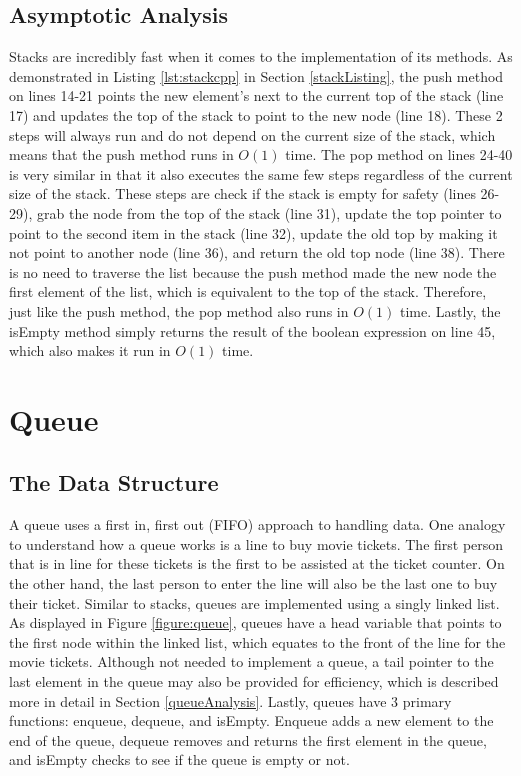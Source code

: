 \documentclass[letterpaper, 10pt,DIV=13]{scrartcl}
\numberwithin{equation}{section} %
\numberwithin{figure}{section} %
\numberwithin{table}{section} %
\begin{document}
\subsection{Asymptotic Analysis}\label{stackAnalysis}
Stacks are incredibly fast when it comes to the implementation of its methods. As demonstrated in Listing \ref{lst:stackcpp} in Section \ref{stackListing}, the push method on lines 14-21 points the new element's next to the current top of the stack (line 17) and updates the top of the stack to point to the new node (line 18). These 2 steps will always run and do not depend on the current size of the stack, which means that the push method runs in $O(1)$ time. The pop method on lines 24-40 is very similar in that it also executes the same few steps regardless of the current size of the stack. These steps are check if the stack is empty for safety (lines 26-29), grab the node from the top of the stack (line 31), update the top pointer to point to the second item in the stack (line 32), update the old top by making it not point to another node (line 36), and return the old top node (line 38). There is no need to traverse the list because the push method made the new node the first element of the list, which is equivalent to the top of the stack. Therefore, just like the push method, the pop method also runs in $O(1)$ time. Lastly, the isEmpty method simply returns the result of the boolean expression on line 45, which also makes it run in $O(1)$ time.

\section{Queue}
\subsection{The Data Structure}\label{queueDataStructure}
A queue uses a first in, first out (FIFO) approach to handling data. One analogy to understand how a queue works is a line to buy movie tickets. The first person that is in line for these tickets is the first to be assisted at the ticket counter. On the other hand, the last person to enter the line will also be the last one to buy their ticket. Similar to stacks, queues are implemented using a singly linked list. As displayed in Figure \ref{figure:queue}, queues have a head variable that points to the first node within the linked list, which equates to the front of the line for the movie tickets. Although not needed to implement a queue, a tail pointer to the last element in the queue may also be provided for efficiency, which is described more in detail in Section \ref{queueAnalysis}. Lastly, queues have 3 primary functions: enqueue, dequeue, and isEmpty. Enqueue adds a new element to the end of the queue, dequeue removes and returns the first element in the queue, and isEmpty checks to see if the queue is empty or not.
\end{document}

